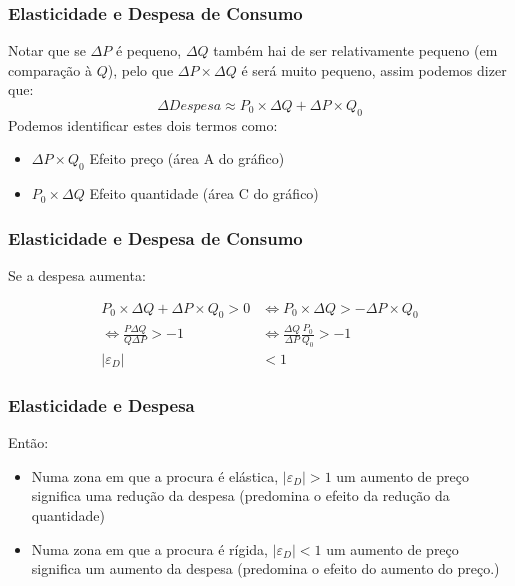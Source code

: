 \begin{frame}
	\frametitle{Elasticidade e Despesa de Consumo}
	Notar que se $\Delta P$ \'e pequeno, $\Delta Q$ tamb\'em hai de ser relativamente pequeno (em compara\c c\~ao \`a $Q$),  pelo que $\Delta P\times\Delta Q$ \'e ser\'a muito pequeno, assim podemos dizer que:\[\Delta Despesa \approx P_0\times \Delta Q + \Delta P \times Q_0\]
	Podemos identificar estes dois termos como:

	\begin{itemize}
			\item $\Delta P \times Q_0$ Efeito pre\c co (\'area A do gr\'afico)
			\item $P_0\times \Delta Q$ Efeito quantidade (\'area C do gr\'afico)
	\end{itemize}
\end{frame}

\begin{frame}
\frametitle{Elasticidade e Despesa de Consumo}

	Se a despesa aumenta:

	\begin{align*}
		P_0\times \Delta Q + \Delta P \times Q_0>0 &\Leftrightarrow P_0\times \Delta Q > -\Delta P \times Q_0 \\
		\Leftrightarrow \frac{P\Delta Q}{Q\Delta P}>-1&\Leftrightarrow \frac{\Delta Q}{\Delta P}\frac{P_0}{Q_0}>-1\\ |\varepsilon_D|&<1
	\end{align*}
\end{frame}

\begin{frame}
	\frametitle{Elasticidade e Despesa}
	Ent\~ao:
	\begin{itemize}
		\setlength{\itemsep}{0.5cm}
		\item Numa zona em que a procura \'e el\'astica, $|\varepsilon_D|>1$ um aumento de pre\c co significa uma redu\c c\~ao da despesa (predomina o efeito da redu\c c\~ao da quantidade)
		\item Numa zona em que a procura \'e r\'igida, $|\varepsilon_D|<1$ um aumento de pre\c co significa um aumento da despesa (predomina o efeito do aumento do pre\c co.)
	\end{itemize}
\end{frame}


